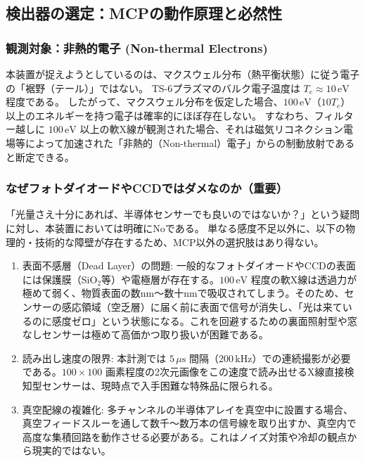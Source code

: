 \subsection{検出器の選定：MCPの動作原理と必然性}
\subsubsection{観測対象：非熱的電子 (Non-thermal Electrons)}
本装置が捉えようとしているのは、マクスウェル分布（熱平衡状態）に従う電子の「裾野（テール）」ではない。
TS-6プラズマのバルク電子温度は $T_e \approx 10\,\mathrm{eV}$ 程度である\cite{Takeda2023}。
したがって、マクスウェル分布を仮定した場合、$100\,\mathrm{eV}$（$10 T_e$）以上のエネルギーを持つ電子は確率的にほぼ存在しない。
すなわち、フィルター越しに $100\,\mathrm{eV}$ 以上の軟X線が観測された場合、それは磁気リコネクション電場等によって加速された「非熱的（Non-thermal）電子」からの制動放射であると断定できる\cite{Takeda2023}。

\subsubsection{なぜフォトダイオードやCCDではダメなのか（重要）}
「光量さえ十分にあれば、半導体センサーでも良いのではないか？」という疑問に対し、本装置においては明確にNoである。
単なる感度不足以外に、以下の物理的・技術的な障壁が存在するため、MCP以外の選択肢はあり得ない。

\begin{enumerate}
    \item 表面不感層（Dead Layer）の問題:
    一般的なフォトダイオードやCCDの表面には保護膜（SiO$_2$等）や電極層が存在する。$100\,\mathrm{eV}$ 程度の軟X線は透過力が極めて弱く、物質表面の数nm〜数十nmで吸収されてしまう。そのため、センサーの感応領域（空乏層）に届く前に表面で信号が消失し、「光は来ているのに感度ゼロ」という状態になる。これを回避するための裏面照射型や窓なしセンサーは極めて高価かつ取り扱いが困難である。
    
    \item 読み出し速度の限界:
    本計測では $5\,\mu\mathrm{s}$ 間隔（$200\,\mathrm{kHz}$）での連続撮影が必要である。$100 \times 100$ 画素程度の2次元画像をこの速度で読み出せるX線直接検知型センサーは、現時点で入手困難な特殊品に限られる。
    
    \item 真空配線の複雑化:
    多チャンネルの半導体アレイを真空中に設置する場合、真空フィードスルーを通して数千〜数万本の信号線を取り出すか、真空内で高度な集積回路を動作させる必要がある。これはノイズ対策や冷却の観点から現実的ではない。
\end{enumerate}

